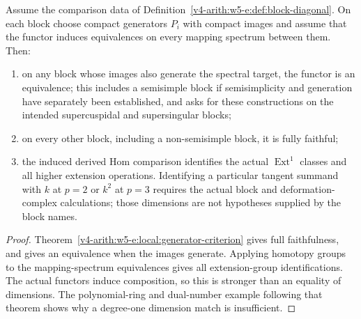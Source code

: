 \begin{theorem}
\label{v4-arith:w5-e:thm:f1a2}
Assume the comparison data of
Definition~\ref{v4-arith:w5-e:def:block-diagonal}. On each block choose
compact generators $P_i$ with compact images and assume that the
functor induces equivalences on every mapping spectrum between them.
Then:
\begin{enumerate}
\item\label{v4-arith:w5-e:thm:f1a2-item-ss} on any block whose images
also generate the spectral target, the functor is an equivalence;
this includes a semisimple block if semisimplicity and generation
have separately been established, and asks for these constructions
on the intended supercuspidal and supersingular blocks;
\item\label{v4-arith:w5-e:thm:f1a2-item-nss} on every other block,
including a non-semisimple block, it is fully faithful;
\item\label{v4-arith:w5-e:thm:f1a2-item-ext} the induced derived Hom
comparison identifies the actual $\operatorname{Ext}^1$ classes and
all higher extension operations. Identifying a particular tangent
summand with $k$ at $p=2$ or $k^2$ at $p=3$ requires the actual block
and deformation-complex calculations; those dimensions are not
hypotheses supplied by the block names.
\end{enumerate}
\end{theorem}
\begin{proof}
Theorem~\ref{v4-arith:w5-e:local:generator-criterion} gives full
faithfulness, and gives an equivalence when the images generate.
Applying homotopy groups to the mapping-spectrum equivalences gives
all extension-group identifications. The actual functors induce
composition, so this is stronger than an equality of dimensions.
The polynomial-ring and dual-number example following that theorem
shows why a degree-one dimension match is insufficient.
\end{proof}

